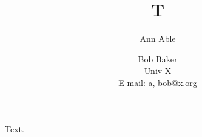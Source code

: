 \documentclass{article}
\title{T}\author{Ann Able \and Bob Baker\\ Univ X\\ E-mail: a, bob@x.org}
\begin{document}
\maketitle
Text.
\end{document}
